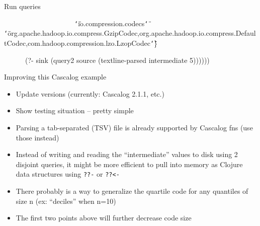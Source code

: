 \documentclass{beamer}
\renewcommand{\textquotedbl}{\texttt{\char`\"}}
\begin{document}
\begin{frame}{Run queries}
\begin{small}
{\ttfamily\color{black}
\ \ \ \ \ \ \ \ \ \ \ \ \ \ \ \ \ \ \ \ \textcolor[rgb]{0.54509807,0.13333334,0.32156864}{{\textquotedbl}io.compression.codecs{\textquotedbl}}
\textcolor[rgb]{0.54509807,0.13333334,0.32156864}{{\textquotedbl}org.apache.hadoop.io.compress.GzipCodec,org.apache.hadoop.io.compress.DefaultCodec,com.hadoop.compression.lzo.LzopCodec{\textquotedbl}}\}}

{\ttfamily\color{black}
\ \ \ \ \ \ \textcolor[rgb]{0.54901963,0.54901963,0.54901963}{(}?- sink
\textcolor[rgb]{0.54901963,0.54901963,0.54901963}{(}query2 source
\textcolor[rgb]{0.54901963,0.54901963,0.54901963}{(}textline-parsed
intermediate
5\textcolor[rgb]{0.54901963,0.54901963,0.54901963}{))))))}}
\end{small}
\end{frame}

\begin{frame}{Improving this Cascalog example}
  \begin{itemize}
  \item Update versions (currently: Cascalog 2.1.1, etc.)
  \item Show testing situation -- pretty simple
  \item Parsing a tab-separated (TSV) file is already supported by
    Cascalog fns (use those instead)
  \item Instead of writing and reading the ``intermediate'' values to
    disk using 2 disjoint queries, it might be more efficient to pull into memory as Clojure
    data structures using \texttt{??-} or \texttt{??<-}
  \item There probably is a way to generalize the quartile code for
    any quantiles of size n (ex: ``deciles'' when n=10)
  \item The first two points above will further decrease code size
  \end{itemize}
\end{frame}
\end{document}
